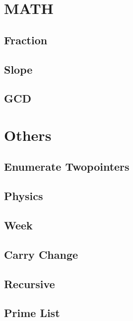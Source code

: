 \section{MATH}
    \subsection{Fraction}
            
    \subsection{Slope}
            
    \subsection{GCD}
            

\section{Others}
    \subsection{Enumerate Twopointers}
            
    \subsection{Physics}
            
    \subsection{Week}
            
    \subsection{Carry Change}
            
    \subsection{Recursive}
            
    \subsection{Prime List}
            
